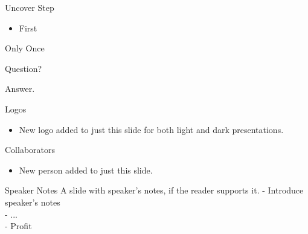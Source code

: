 \documentclass[aspectratio=169,12pt]{beamer}%
\begin{document}
    \begin{frame}{Uncover Step}
        \onecolumnfull%
        {%
            \begin{itemize}%
                \item First
            \end{itemize}%
        }%
    \end{frame}

    \begin{frame}{Only Once}
        \onecolumnfull%
        {%
            \begin{itemize}%
                \onlyonce%
                {%
                    \item Question?
                }%
                \onlyonce%
                {%
                    \item Answer.
                }%
            \end{itemize}%
        }%
    \end{frame}

    \begin{frame}{Logos}
        \onecolumnfull%
        {%
            \begin{itemize}
                \item New logo added to just this slide for both light and dark presentations.
            \end{itemize}
        }%
    \end{frame}
    \resetlogos{}

    \begin{frame}{Collaborators}
        \onecolumnfull%
        {%
            \begin{itemize}
                \item New person added to just this slide.
            \end{itemize}
        }%
    \end{frame}
    \clearpeople{}


    \begin{frame}{Speaker Notes}
        \onecolumneven%
        {%
            A slide with speaker's notes, if the reader supports it.
        }%
        \say%
        {%
            - Introduce speaker's notes\\%
            - ...\\%
            - Profit%
        }%
    \end{frame}
\end{document}
